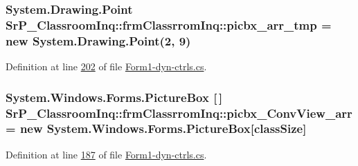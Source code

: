 \hypertarget{class_sr_p___classroom_inq_1_1frm_classrrom_inq_a019be294be5d02bea4369298d2a135db}{
\subsubsection[{picbx\-\_\-arr\-\_\-tmp}]{\setlength{\rightskip}{0pt plus 5cm}\-System.\-Drawing.\-Point {\bf \-Sr\-P\-\_\-\-Classroom\-Inq\-::frm\-Classrrom\-Inq\-::picbx\-\_\-arr\-\_\-tmp} = new \-System.\-Drawing.\-Point(2, 9)}}
\label{class_sr_p___classroom_inq_1_1frm_classrrom_inq_a019be294be5d02bea4369298d2a135db}


\-Definition at line \hyperlink{_form1-dyn-ctrls_8cs_source_l00202}{202} of file \hyperlink{_form1-dyn-ctrls_8cs_source}{\-Form1-\/dyn-\/ctrls.\-cs}.

\hypertarget{class_sr_p___classroom_inq_1_1frm_classrrom_inq_a4d179283a68569b1220534d91ddcf6d1}{
\subsubsection[{picbx\-\_\-\-Conv\-View\-\_\-arr}]{\setlength{\rightskip}{0pt plus 5cm}\-System.\-Windows.\-Forms.\-Picture\-Box \mbox{[}$\,$\mbox{]} {\bf \-Sr\-P\-\_\-\-Classroom\-Inq\-::frm\-Classrrom\-Inq\-::picbx\-\_\-\-Conv\-View\-\_\-arr} = new \-System.\-Windows.\-Forms.\-Picture\-Box\mbox{[}{\bf class\-Size}\mbox{]}}}
\label{class_sr_p___classroom_inq_1_1frm_classrrom_inq_a4d179283a68569b1220534d91ddcf6d1}


\-Definition at line \hyperlink{_form1-dyn-ctrls_8cs_source_l00187}{187} of file \hyperlink{_form1-dyn-ctrls_8cs_source}{\-Form1-\/dyn-\/ctrls.\-cs}.

